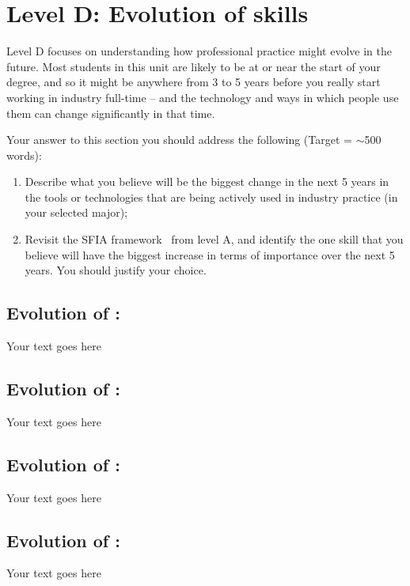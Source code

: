 \documentclass[a4paper, 11pt]{report}
\begin{document}

\newpage
\section{Level D: Evolution of skills}

Level D focuses on understanding how professional practice might evolve in the future. Most students in this unit are likely to be at or near the start of your degree, and so it might be anywhere from 3 to 5 years before you really start working in industry full-time -- and the technology and ways in which people use them can change significantly in that time. 

Your answer to this section you should address the following (Target = $\sim$500 words):
\begin{enumerate}
	\item Describe what you believe will be the biggest change in the next 5 years in the tools or technologies that are being actively used in industry practice (in your selected major);
	\item Revisit the SFIA framework~\cite{sfia} from level A, and identify the one skill that you believe will have the biggest increase in terms of importance over the next 5 years. You should justify your choice.
\end{enumerate}


\subsection{Evolution of \majA: \studA}

Your text goes here

\subsection{Evolution of \majB: \studB}

Your text goes here

\subsection{Evolution of \majC: \studC}

Your text goes here

\subsection{Evolution of \majD: \studD}

Your text goes here




\newpage



\end{document}
